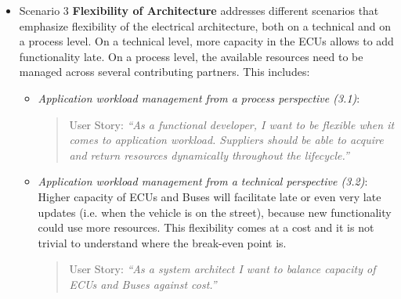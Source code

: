 \begin{itemize}
\begin{itemize}

\item {\em The danger of architecture and design  evolving in different directions (2.2)}: If not actively managed,  architecture and design diverge over time. 
The architecture is then perceived as outdated and not useful, thus it looses its ability to guide design decisions and implementation.

\begin{quote}
{User Story:} 
\emph{``As a system architect or function developer I want a stringent correlation between architecture and design. Otherwise, one or the other is wrong.''}
\end{quote}
\end{itemize}

\item Scenario 3 {\bf Flexibility of Architecture} addresses different scenarios that emphasize flexibility of the electrical architecture, both on a technical and on a process level. On a technical level, more capacity in the ECUs allows to add functionality late. 
On a process level, the available resources need to be managed across several contributing partners.
This includes:

\begin{itemize}
\item {\em Application workload management from a process perspective (3.1)}: 
\begin{quote}
{User Story:} 
\emph{``As a functional developer, I want to be flexible when it comes to application workload. 
Suppliers should be able to acquire and return resources dynamically throughout the lifecycle.''}
\end{quote}

\item {\em Application workload management from a technical perspective (3.2)}: Higher capacity of ECUs and Buses will facilitate late or even very late updates (i.e. when the vehicle is on the street), because new functionality could use more resources.
This flexibility comes at a cost and it is not trivial to understand where the break-even point is.

\begin{quote}
{User Story:} 
\emph{``As a system architect I want to balance capacity of ECUs and Buses against cost.''}
\end{quote}


\end{itemize}
\end{itemize}
